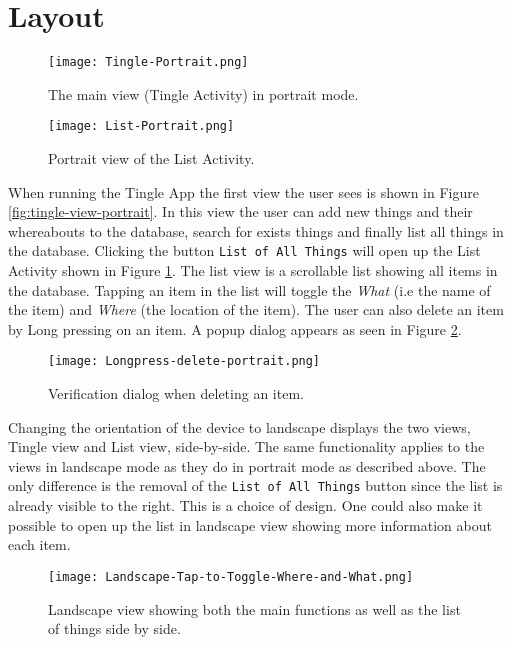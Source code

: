 \section{Layout}

\begin{figure}[!htb]
		\centering
		\texttt{[image: Tingle-Portrait.png]}
		\caption{The main view (Tingle Activity) in portrait mode.}
		\label{fig:tingle-view-portrait}
	\endminipage\hfill
		\centering
		\texttt{[image: List-Portrait.png]}
		\caption{Portrait view of the List Activity.}
		\label{fig:list-view-portrait}
	\endminipage\hfill
\end{figure}

When running the Tingle App the first view the user sees is shown in Figure \ref{fig:tingle-view-portrait}. In this view the user can add new things and their whereabouts to the database, search for exists things and finally list all things in the database. Clicking the button \texttt{List of All Things} will open up the List Activity shown in Figure \ref{fig:list-view-portrait}. The list view is a scrollable list showing all items in the database. Tapping an item in the list will toggle the \emph{What} (i.e the name of the item) and \emph{Where} (the location of the item). The user can also delete an item by Long pressing on an item. A popup dialog appears as seen in Figure \ref{fig:delete-verification-dialog}.

\begin{figure}[H]
	\centering
	\texttt{[image: Longpress-delete-portrait.png]}
	\caption{Verification dialog when deleting an item.}
	\label{fig:delete-verification-dialog}
\end{figure}


Changing the orientation of the device to landscape displays the two views, Tingle view and List view, side-by-side. The same functionality applies to the views in landscape mode as they do in portrait mode as described above. The only difference is the removal of the \texttt{List of All Things} button since the list is already visible to the right. This is a choice of design. One could also make it possible to open up the 
list in landscape view showing more information about each item.

\begin{figure}[H]
	\centering
	\texttt{[image: Landscape-Tap-to-Toggle-Where-and-What.png]}
	\caption{Landscape view showing both the main functions as well as the list of things side by side.}
	\label{fig:landscape-main-view}
\end{figure}

